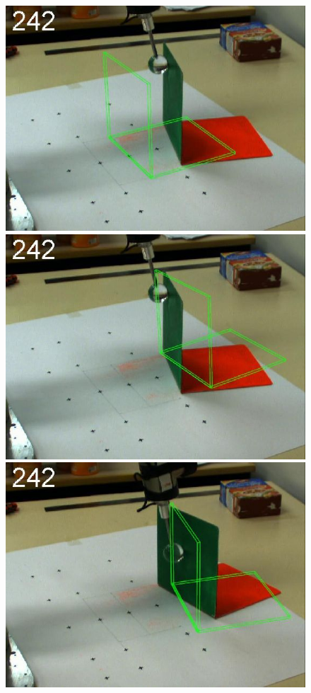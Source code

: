 \begin{figure}[tb]
{\includegraphics[width=\imgBXwid]{./B2_1exp_58_4}
\includegraphics[width=\imgBXwid]{./B2_2exp_58_4}
\includegraphics[width=\imgBXwid]{./B2_2exp_38_4}
}
\end{figure}
